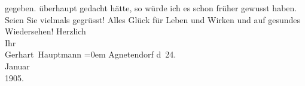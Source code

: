 \begin{ledgroupsized}[t]{13cm}
{{{                        gegeben.}}}\label{K_L01494_1h} überhaupt gedacht hätte, so würde ich es schon früher
                    gewusst haben. Seien Sie vielmals gegrüsst! Alles Glück für Leben und Wirken und
                    auf gesundes Wiedersehen!\pend
           \pstart
           Herzlich{\\[\baselineskip]} Ihr{\\[\baselineskip]}\spacefill\mbox{Gerhart Hauptmann}\pend
           \leftskip=0em{}\pstart
           \noindent{}{\pb}Agnetendorf\pend
           \pstart
           d 24.{\\}Januar{\\}1905.\pend
           \endnumbering{}\end{ledgroupsized}  \newcommand{\dateiname}{L01494}\newcommand{\titel}{Gerhart Hauptmann an Arthur Schnitzler, 24. 1. 1905}\newcommand{\editorInnen}{Martin Anton Müller und Gerd-Hermann Susen}
            \footnotesize
\begin{ledgroupsized}[t]{11.5cm}
\end{ledgroupsized}
         
      